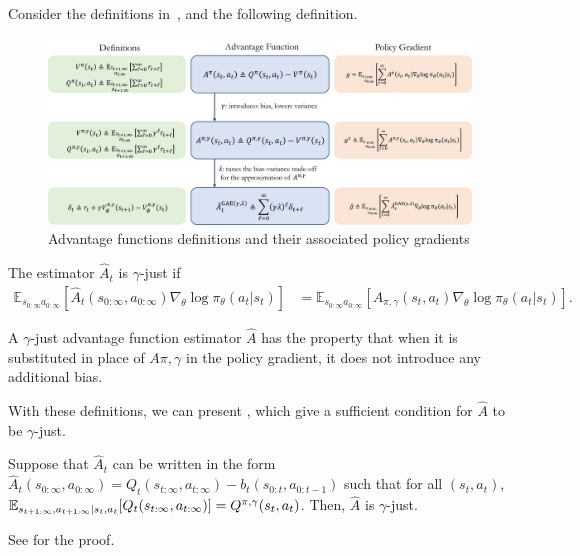 \documentclass{article}
\begin{document}
\vspace{10pt}
Consider the definitions in~, and the following definition.

\begin{figure}[h]
    \centering
    \includegraphics[width=1.0\linewidth]{Figures/GAE_table.png}
    \caption{Advantage functions definitions and their associated policy gradients}
    \label{fig:gae_summary}
\end{figure}

\begin{definition} 
The estimator $\hat{A}_t$ is $\gamma$-just if
\begin{align*}
\mathbb{E}_{s_{0:\infty} a_{0:\infty}} [\hat{A}_t(s_{0:\infty}, a_{0:\infty}) \nabla_{\theta} \log \pi_{\theta}(a_t | s_t) ] &= \mathbb{E}_{s_{0:\infty} a_{0:\infty}} [A_{\pi,\gamma}(s_t, a_t) \nabla_{\theta} \log \pi_{\theta}(a_t | s_t)].
\end{align*}
\end{definition}

A $\gamma$-just advantage function estimator $\hat{A}$ has the property that when it is substituted in place of $A{\pi,\gamma}$ in the policy gradient, it does not introduce any additional bias.

With these definitions, we can present , which give a sufficient condition for $\hat A$ to be $\gamma$-just.

\begin{proposition}\label{prop:GAE_prop}
    Suppose that $\hat A_t$ can be written in the form $\hat A_t(s_{0:\infty},a_{0:\infty}) = Q_t(s_{t:\infty},a_{t:\infty}) - b_t(s_{0:t},a_{0:t-1})$ such that for all $(s_t,a_t)$, ${\mathbb E}_{s_{t+1:\infty}, a_{t+1:\infty}\vert {s_t, a_t}}[Q_t(s_{t:\infty},a_{t:\infty})] = Q^{\pi, \gamma}(s_t, a_t)$. Then, $\hat A$ is $\gamma$-just.
\end{proposition}
See \cite{schulman2015high} for the proof.
\end{document}
